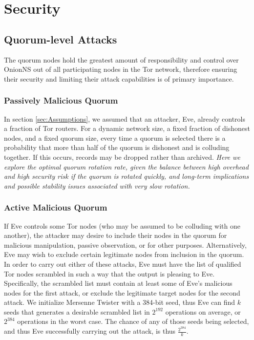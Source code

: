 \section{Security}

\subsection{Quorum-level Attacks}

The quorum nodes hold the greatest amount of responsibility and control over OnionNS out of all participating nodes in the Tor network, therefore ensuring their security and limiting their attack capabilities is of primary importance.

\subsubsection{Passively Malicious Quorum}

In section \ref{sec:Assumptions}, we assumed that an attacker, Eve, already controls a fraction of Tor routers. For a dynamic network size, a fixed fraction of dishonest nodes, and a fixed quorum size, every time a quorum is selected there is a probability that more than half of the quorum is dishonest and is colluding together. If this occurs, records may be dropped rather than archived. \emph{Here we explore the optimal quorum rotation rate, given the balance between high overhead and high security risk if the quorum is rotated quickly, and long-term implications and possible stability issues associated with very slow rotation.}

\subsubsection{Active Malicious Quorum}

If Eve controls some Tor nodes (who may be assumed to be colluding with one another), the attacker may desire to include their nodes in the quorum for malicious manipulation, passive observation, or for other purposes. Alternatively, Eve may wish to exclude certain legitimate nodes from inclusion in the quorum. In order to carry out either of these attacks, Eve must have the list of qualified Tor nodes scrambled in such a way that the output is pleasing to Eve. Specifically, the scrambled list must contain at least some of Eve's malicious nodes for the first attack, or exclude the legitimate target nodes for the second attack. We initialize Mersenne Twister with a 384-bit seed, thus Eve can find $ k $ seeds that generates a desirable scrambled list in $ 2^{192} $ operations on average, or $ 2^{384} $ operations in the worst case. The chance of any of those seeds being selected, and thus Eve successfully carrying out the attack, is thus $ \frac{2^{384}}{k} $.

